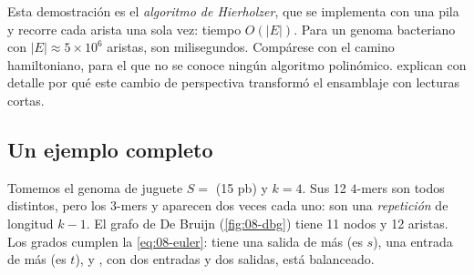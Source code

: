 Esta demostración es el \emph{algoritmo de Hierholzer}, que se implementa con una pila y recorre cada arista una sola vez: tiempo $O(|E|)$. Para un genoma bacteriano con $|E|\approx5\times10^6$ aristas, son milisegundos. Compárese con el camino hamiltoniano, para el que no se conoce ningún algoritmo polinómico. \textcite{c08-compeau2011} explican con detalle por qué este cambio de perspectiva transformó el ensamblaje con lecturas cortas.

\subsection{Un ejemplo completo}

Tomemos el genoma de juguete $S={}$ (15 pb) y $k=4$. Sus 12 $4$-mers son todos distintos, pero los $3$-mers  y  aparecen dos veces cada uno: son una \emph{repetición} de longitud $k-1$. El grafo de De Bruijn (\cref{fig:08-dbg}) tiene 11 nodos y 12 aristas. Los grados cumplen la \cref{eq:08-euler}:  tiene una salida de más (es $s$),  una entrada de más (es $t$), y , con dos entradas y dos salidas, está balanceado.

